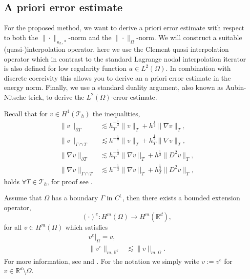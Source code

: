 
\subsection{A priori error estimate}%
\label{sec:a_priori_estimates}


For the proposed method, we want to derive a priori error estimate with respect to both the  $\| \cdot  \|_{a_{h},*   }^{  } $-norm and the  $\| \cdot  \|_{ \Omega  }^{
} $-norm.
We will construct a suitable (quasi-)interpolation operator, here we use the Clement quasi interpolation operator which in contrast to the standard Lagrange nodal interpolation iterator is also defined for low regularity function $u \in L^{2}(
\Omega ) $.
In combination with discrete coercivity this allows you to derive an a priori error estimate in the energy norm. Finally, we use a standard duality argument, also known as Aubin-Nitsche trick, to derive the $L^{2}( \Omega ) $-error estimate.

Recall that for $v \in H^{1}( \mathcal{T } _{h}) $ the inequalities,
\begin{align}
    \| v \|_{ \partial T }^{  } &\lesssim h^{-\frac{1}{2}}_{T}\|  v \|_{ T }^{  }+ h^{\frac{1}{2}} \| \nabla v \|_{T  }^{   }  , \\
    \| v \|_{ \Gamma \cap T }^{  } &\lesssim  h^{-\frac{1}{2}} \| v \|_{T  }^{  }   + h^{\frac{1}{2}}_{T} \| \nabla v \|_{ T }^{  },\\
    \label{eq:trace:1}
    \| \nabla v \|_{ \partial T }^{  } &\lesssim h^{-\frac{1}{2}}_{T}\|  \nabla v \|_{ T }^{  }+ h^{\frac{1}{2}} \| D^2 v \|_{T  }^{   }  , \\
    \label{eq:trace:2}
    \| \nabla v \|_{ \Gamma \cap T }^{  } &\lesssim  h^{-\frac{1}{2}} \| \nabla v \|_{T  }^{  }   + h^{\frac{1}{2}}_{T} \| D^2 v \|_{ T }^{  },
\end{align}
holds $\forall T \in \mathcal{T} _{h}$, for proof see \cite[Lemma 4.2]{hansbo2003finite}.

Assume that $\Omega $ has a boundary $\Gamma $ in $C^{1}$, then there exists a bounded extension operator,
\begin{equation}
    ( \cdot ) ^{e}: H^{m}( \Omega )  \to H^{m} ( \mathbb{R} ^{d}),
\end{equation}
for all  $v \in H^{m}( \Omega )$ which satisfies
\begin{equation}
    \begin{split}
 v^{e}| _{\Omega } =   v,  \\
\| v^{e} \|_{ m,\mathbb{R} ^{d}  }^{  } & \lesssim \| v \|_{ m, \Omega  }^{  }.
    \end{split}
\end{equation}
For more information, see \cite[Theorem 9.7]{brezis2011functional} and \cite[p.181, p.185]{stein1970singular}. For the notation we simply write $ v := v^{e}   $ for $v \in \mathbb{R} ^{d} \setminus \Omega $.

